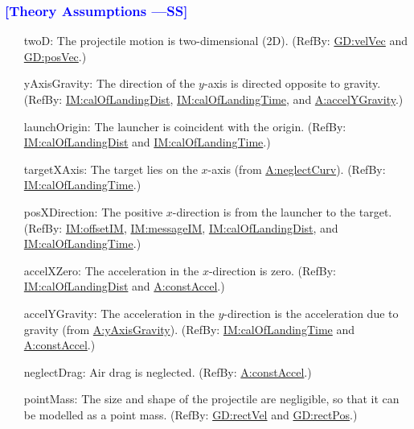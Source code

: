 \documentclass[12pt]{article}
\newcommand{\authornote}[3]{\textcolor{#1}{[#3 ---#2]}}
\newcommand{\authornote}[3]{}
\newcommand{\wss}[1]{\authornote{blue}{SS}{#1}}
\begin{document}
\subsubsection{\wss{Theory Assumptions}}

\begin{itemize}
\item[twoD:\phantomsection\label{twoD}]{The projectile motion is two-dimensional (2D). (RefBy: \hyperref[GD:velVec]{GD:velVec} and \hyperref[GD:posVec]{GD:posVec}.)}
\item[yAxisGravity:\phantomsection\label{yAxisGravity}]{The direction of the $y$-axis is directed opposite to gravity. (RefBy: \hyperref[IM:calOfLandingDist]{IM:calOfLandingDist}, \hyperref[IM:calOfLandingTime]{IM:calOfLandingTime}, and \hyperref[accelYGravity]{A:accelYGravity}.)}
\item[launchOrigin:\phantomsection\label{launchOrigin}]{The launcher is coincident with the origin. (RefBy: \hyperref[IM:calOfLandingDist]{IM:calOfLandingDist} and \hyperref[IM:calOfLandingTime]{IM:calOfLandingTime}.)}
\item[targetXAxis:\phantomsection\label{targetXAxis}]{The target lies on the $x$-axis (from \hyperref[neglectCurv]{A:neglectCurv}). (RefBy: \hyperref[IM:calOfLandingTime]{IM:calOfLandingTime}.)}
\item[posXDirection:\phantomsection\label{posXDirection}]{The positive $x$-direction is from the launcher to the target. (RefBy: \hyperref[IM:offsetIM]{IM:offsetIM}, \hyperref[IM:messageIM]{IM:messageIM}, \hyperref[IM:calOfLandingDist]{IM:calOfLandingDist}, and \hyperref[IM:calOfLandingTime]{IM:calOfLandingTime}.)}
\item[accelXZero:\phantomsection\label{accelXZero}]{The acceleration in the $x$-direction is zero. (RefBy: \hyperref[IM:calOfLandingDist]{IM:calOfLandingDist} and \hyperref[constAccel]{A:constAccel}.)}
\item[accelYGravity:\phantomsection\label{accelYGravity}]{The acceleration in the $y$-direction is the acceleration due to gravity (from \hyperref[yAxisGravity]{A:yAxisGravity}). (RefBy: \hyperref[IM:calOfLandingTime]{IM:calOfLandingTime} and \hyperref[constAccel]{A:constAccel}.)}
\item[neglectDrag:\phantomsection\label{neglectDrag}]{Air drag is neglected. (RefBy: \hyperref[constAccel]{A:constAccel}.)}
\item[pointMass:\phantomsection\label{pointMass}]{The size and shape of the projectile are negligible, so that it can be modelled as a point mass. (RefBy: \hyperref[GD:rectVel]{GD:rectVel} and \hyperref[GD:rectPos]{GD:rectPos}.)}

\end{itemize}
\end{document}
